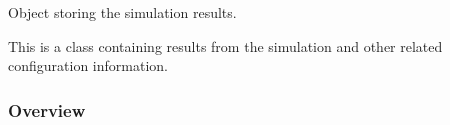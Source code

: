 \documentclass[letterpaper,10pt,english]{sphinxmanual}
\begin{document}
\begin{fulllineitems}
\label{\detokenize{autoapi/euromod/core/index:euromod.core.Simulation}}
\pysigstartsignatures
{}
\pysigstopsignatures
\sphinxAtStartPar
Object storing the simulation results.

\sphinxAtStartPar
This is a class containing results from the simulation 
and other related configuration information.
\subsubsection*{Overview}



\end{fulllineitems}
\end{document}

